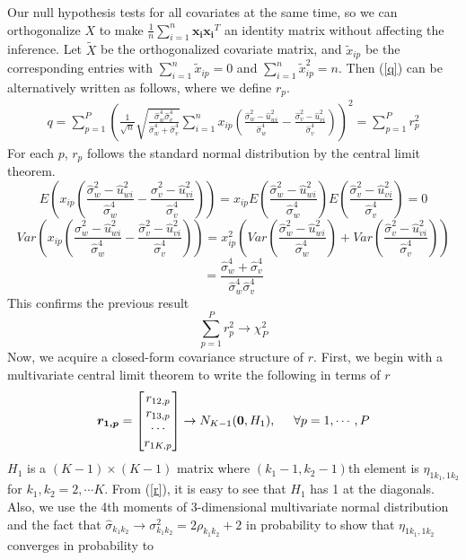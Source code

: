 \documentclass[12pt]{article}
\theoremstyle{theorem}
\begin{document}
\noindent Our null hypothesis tests for all covariates at the same time, so we can orthogonalize $X$ to make $\frac{1}{n} \sum_{i=1}^{n} \bm{x_i} \bm{x_i}^T$ an identity matrix without affecting the inference. Let $\tilde{X}$ be the orthogonalized covariate matrix, and $\tilde{x}_{ip}$ be the corresponding entries with $\sum_{i=1}^{n}\tilde{x}_{ip} = 0$ and $\sum_{i=1}^{n} \tilde{x}_{ip}^2  = n$. Then (\ref{q}) can be alternatively written as follows, where we define $r_{p}.$
\begin{align}
q = \sum_{p=1}^{P}
 \left(\frac{1}{\sqrt{n}}
 \sqrt{\frac{\hat{\sigma}_w^4 \hat{\sigma}_v^4}{\hat{\sigma}_w^4 + \hat{\sigma}_v^4}}
 \sum_{i=1}^{n} x_{ip} \left( \frac{\hat{\sigma}_w^2 - \hat{u}_{wi}^2}{\hat{\sigma}_w^4}
 - \frac{\hat{\sigma}_v^2 - \hat{u}_{vi}^2}{\hat{\sigma}_v^4}
 \right)
\right)^2 = \sum_{p=1}^{P}r_p^2
\label{r}
\end{align}
For each $p$, $r_p$ follows the standard normal distribution by the central limit theorem. 
$$E\left(x_{ip}\left( \frac{\hat{\sigma}_w^2 - \hat{u}_{wi}^2}{\hat{\sigma}_w^4}
 - \frac{\hat{\sigma}_v^2 - \hat{u}_{vi}^2}{\hat{\sigma}_v^4}
 \right)\right) = x_{ip} E\left( \frac{\hat{\sigma}_w^2 - \hat{u}_{wi}^2}{\hat{\sigma}_w^4} \right) E\left( \frac{\hat{\sigma}_v^2 - \hat{u}_{vi}^2}{\hat{\sigma}_v^4}
 \right) = 0$$
$$Var\left(x_{ip}\left( \frac{\hat{\sigma}_w^2 - \hat{u}_{wi}^2}{\hat{\sigma}_w^4}
 - \frac{\hat{\sigma}_v^2 - \hat{u}_{vi}^2}{\hat{\sigma}_v^4}
 \right)\right) = 
 x_{ip}^2 \left( Var\left( \frac{\hat{\sigma}_w^2 - \hat{u}_{wi}^2}{\hat{\sigma}_w^4} \right)  + Var\left( \frac{\hat{\sigma}_v^2 - \hat{u}_{vi}^2}{\hat{\sigma}_v^4}
 \right)\right)
 $$
 $$ = \frac{\hat{\sigma}_w^4 + \hat{\sigma}_v^4}{\hat{\sigma}_w^4 \hat{\sigma}_v^4}$$
This confirms the previous result
$$\sum_{p=1}^{P} r_p^2 \rightarrow \chi_P^2$$
\noindent Now, we acquire a closed-form covariance structure of $r$. First, we begin with a multivariate central limit theorem to write the following in terms of $r$
\begin{equation}
\bm{r_{1,p}} = \begin{bmatrix}
r_{12,p} \\ r_{13, p} \\ \cdots \\ r_{1K,p}
\end{bmatrix}  \rightarrow N_{K-1}(\bm{0}, H_1), \hspace{5mm} \forall p = 1, \cdots, P
\label{H}
\end{equation}
$H_1$ is a $(K-1) \times (K-1)$ matrix where $(k_1-1, k_2-1)$th element is $\eta_{1k_1, 1k_2}$ for $k_1, k_2 = 2, \cdots K$. From (\ref{r}), it is easy to see that $H_1$ has 1 at the diagonals. Also, we use the 4th moments of 3-dimensional multivariate normal distribution and the fact that $\hat{\sigma}_{k_1k_2} \rightarrow \sigma_{k_1k_2}^2 = 2\rho_{k_1k_2} + 2$ in probability to show that $\eta_{1k_1, 1k_2}$ converges in probability to
\end{document}
